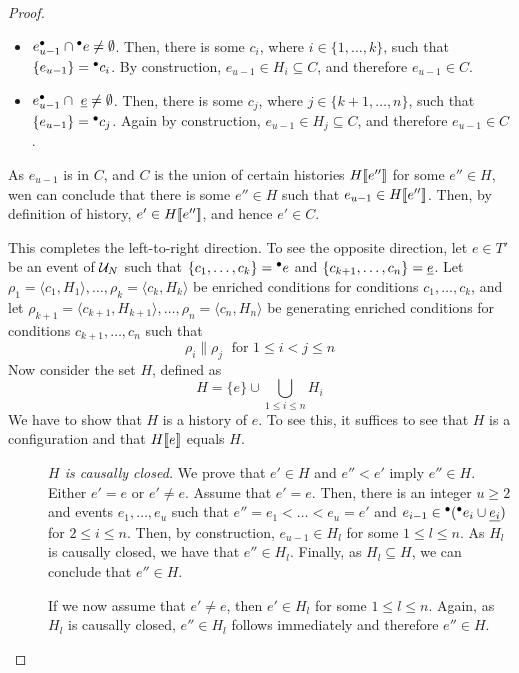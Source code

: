\documentclass[12pt,a4paper]{article}
\begin{document}
\begin{proof}
\begin{itemize}
\item $e_{u-1}^\bullet \cap {}^\bullet e \ne \emptyset$.  Then, there is some
$c_i$, where $i \in \{1, \ldots, k\}$, such that $\{e_{u-1}\} = {}^\bullet c_i$.  By
construction, $e_{u-1} \in H_i \subseteq C$, and therefore $e_{u-1} \in C$.

\item $e_{u-1}^\bullet \cap \ \underline{e} \ne \emptyset$.  Then, there is some
$c_j$, where $j \in \{k+1, \ldots, n\}$, such that $\{e_{u-1}\} = {}^\bullet c_j$.
Again by construction, $e_{u-1} \in H_j \subseteq C$, and therefore $e_{u-1}
\in C$.
\end{itemize}

As $e_{u-1}$ is in $C$, and $C$ is the union of certain histories $H[\![ e'']\!]$
for some $e'' \in H$, wen can conclude that there is some $e'' \in H$ such that
$e_{u-1} \in H[\![ e'']\!]$.  Then, by definition of history, $e' \in H[\![ e'']\!]$,
and hence $e' \in C$.

This completes the left-to-right direction.  To see the opposite direction, let
$e \in T'$ be an event of $\mathcal{U}_{N}$ such that $\{c_1, \ldots, c_k\} = {}^\bullet e$
and $\{c_{k+1}, \ldots, c_n\} = \underline{e}$.  Let $\rho_1 = \langle c_1, H_1
\rangle, \ldots, \rho_k = \langle c_k, H_k \rangle$ be enriched conditions for
conditions $c_1, \ldots, c_k$, and let $\rho_{k+1} = \langle c_{k+1}, H_{k+1}
\rangle, \ldots, \rho_n = \langle c_n, H_n \rangle$ be generating enriched
conditions for conditions $c_{k+1}, \ldots, c_n$ such that $$\rho_i \parallel
\rho_j \; \mbox{ for } 1 \le i < j \le n$$  Now consider the set $H$, defined
as $$H = \{e\} \cup \bigcup_{1 \le i \le n} H_i$$ We have to show that $H$ is a
history of $e$.  To see this, it suffices to see that $H$ is a configuration
and that $H[\![ e]\!]$ equals $H$.

\begin{description}
\item[] \emph{$H$ is causally closed.}  We prove that $e' \in H$ and $e'' < e'$
imply $e'' \in H$.  Either $e' = e$ or $e' \ne e$.  Assume that $e' = e$.
Then, there is an integer $u \ge 2$ and events $e_1, \ldots, e_u$ such that
$e'' = e_1 < \ldots < e_u = e'$ and $e_{i-1} \in {}^\bullet({}^\bullet e_i \cup
\underline{e_i})$ for $2 \le i \le n$.  Then, by construction, $e_{u-1} \in H_l$
for some $1 \le l \le n$.  As $H_l$ is causally closed, we have that $e'' \in
H_l$.  Finally, as $H_l \subseteq H$, we can conclude that $e'' \in H$.

If we now assume that $e' \ne e$, then $e' \in H_l$ for some $1 \le l \le n$.
Again, as $H_l$ is causally closed, $e'' \in H_l$ follows immediately and
therefore $e'' \in H$.


\end{description}
\end{proof}
\end{document}
